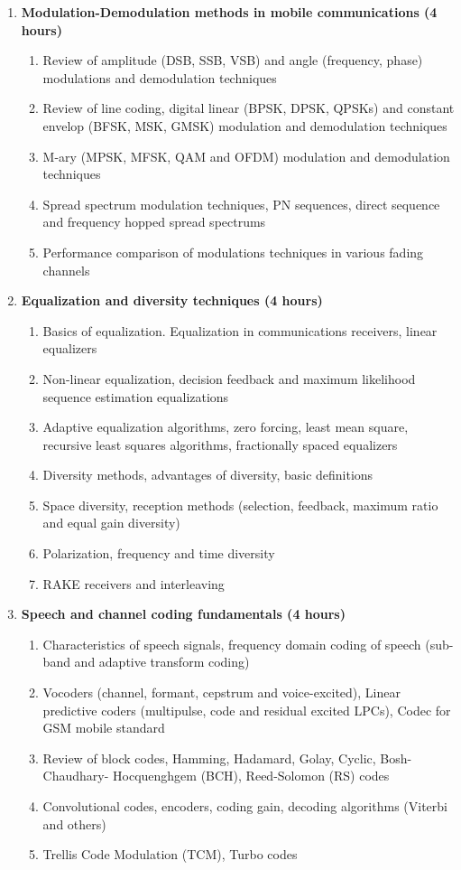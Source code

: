 \begin{enumerate}
  \item \textbf{Modulation-Demodulation methods in mobile communications \hfill (4 hours)}
    \begin{enumerate}
      \item Review of amplitude (DSB, SSB, VSB) and angle (frequency, phase) modulations and demodulation techniques
      \item Review of line coding,  digital linear   (BPSK, DPSK, QPSKs) and constant envelop (BFSK, MSK, GMSK) modulation and demodulation techniques
      \item M-ary (MPSK, MFSK, QAM and OFDM) modulation and demodulation techniques
      \item Spread spectrum modulation techniques, PN sequences, direct sequence and frequency hopped spread spectrums
      \item Performance comparison of modulations techniques in various fading channels
    \end{enumerate}
    \vs

  \item \textbf{Equalization and diversity techniques \hfill (4 hours)}
    \begin{enumerate}
      \item Basics of equalization. Equalization in communications receivers, linear equalizers
      \item Non-linear equalization, decision feedback and maximum likelihood sequence estimation equalizations
      \item Adaptive equalization algorithms, zero forcing, least mean square, recursive least squares algorithms, fractionally spaced equalizers
      \item Diversity methods, advantages of diversity, basic definitions
      \item Space diversity, reception methods (selection, feedback, maximum ratio and equal gain diversity)
      \item Polarization, frequency and time diversity
      \item RAKE receivers and interleaving
    \end{enumerate}
    \vs
    
  \item \textbf{Speech and channel coding fundamentals \hfill (4 hours)}
    \begin{enumerate}
      \item Characteristics of speech signals, frequency domain coding of speech (sub-band and adaptive transform coding)
      \item Vocoders (channel, formant, cepstrum and voice-excited), Linear predictive coders (multipulse, code and residual excited LPCs), Codec for GSM mobile standard
      \item Review of block codes, Hamming, Hadamard, Golay, Cyclic, Bosh-Chaudhary- Hocquenghgem (BCH), Reed-Solomon (RS) codes
      \item Convolutional codes, encoders, coding gain, decoding algorithms (Viterbi and others)
      \item Trellis Code Modulation (TCM), Turbo codes
    \end{enumerate}
    \vs
    

\end{enumerate}

